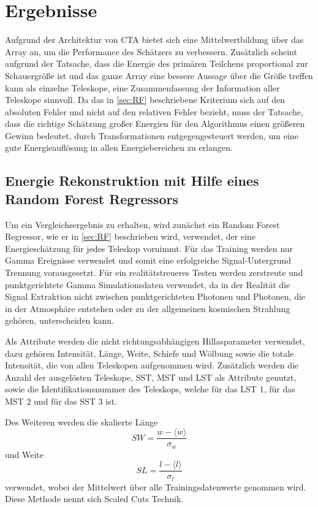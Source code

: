 \chapter{Ergebnisse}
Aufgrund der Architektur von CTA bietet sich eine Mittelwertbildung über das Array an, um die Performance des Schätzers zu verbessern.
Zusätzlich scheint aufgrund der Tatsache, dass die Energie des primären Teilchens proportional zur Schauergröße ist und das
ganze Array eine bessere Aussage über die Größe treffen kann als einzelne Teleskope, eine Zusammenfassung der
Information aller Teleskope sinnvoll.
Da das in \autoref{sec:RF} beschriebene Kriterium sich auf den absoluten Fehler und nicht auf den relativen Fehler
bezieht, muss der Tatsache, dass die richtige Schätzung großer Energien für den Algorithmus einen größeren Gewinn bedeutet,
durch Transformationen entgegengesteuert werden, um eine gute Energieauflösung in allen Energiebereichen zu erlangen.

\section{Energie Rekonstruktion mit Hilfe eines Random Forest Regressors}
\label{sec:first}

Um ein Vergleichsergebnis zu erhalten, wird zunächst ein Random Forest Regressor, wie er in \autoref{sec:RF} beschrieben wird, verwendet,
der eine Energieschätzung für jedes Teleskop vornimmt.
Für das Training werden nur Gamma Ereignisse verwendet und somit eine erfolgreiche Signal-Untergrund Trennung vorausgesetzt.
Für ein realitätstreueres Testen werden zerstreute und punktgerichtete Gamma Simulationsdaten verwendet, da in der
Realität die Signal Extraktion nicht zwischen punktgerichteten Photonen und Photonen, die in der Atmosphäre entstehen oder zu der
allgemeinen kosmischen Strahlung gehören, unterscheiden kann.

Als Attribute werden die nicht richtungsabhängigen Hillasparameter verwendet, dazu gehören Intensität, Länge, Weite, Schiefe und Wölbung sowie
die totale Intensität, die von allen Teleskopen aufgenommen wird.
Zusätzlich werden die Anzahl der ausgelösten Teleskope, SST, MST und LST als Attribute genutzt, sowie die Identifikationsnummer des
Teleskops, welche für das LST $1$, für das MST $2$ und für das SST $3$ ist.

Des Weiteren werden die skalierte Länge
\begin{equation}
  SW = \frac{w- \langle w \rangle}{\sigma_w}
\end{equation}
und Weite
\begin{equation}
  SL = \frac{l - \langle l \rangle}{\sigma_l}
\end{equation}
verwendet, wobei der Mittelwert über alle Trainingsdatenwerte genommen wird. Diese Methode nennt sich Scaled Cuts Technik.~\cite[104]{HESS}

